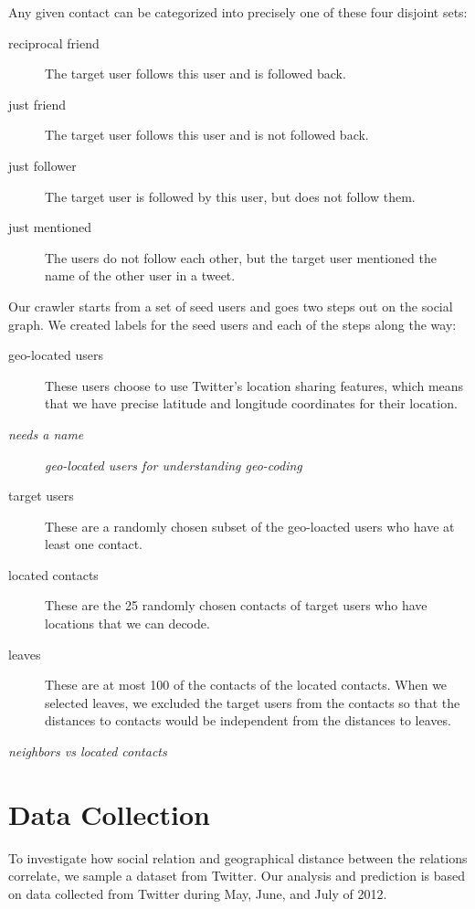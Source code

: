 Any given contact can be categorized into precisely one of these four disjoint
sets:
\begin{description}
\item[reciprocal friend] The target user follows this user and is followed
    back.
\item[just friend] The target user follows this user and is not followed
    back.
\item[just follower] The target user is followed by this user, but does
    not follow them.
\item[just mentioned] The users do not follow each other, but the target
    user mentioned the name of the other user in a tweet.
\end{description}

Our crawler starts from a set of seed users and goes two steps out on the
social graph.
%
We created labels for the seed users and each of the steps along the way:

\begin{description}
\item[geo-located users] These users choose to use Twitter's location sharing
    features, which means that we have precise latitude and longitude
    coordinates for their location.
\item[\emph{needs a name}] \emph{geo-located users for understanding geo-coding}
\item[target users] These are a randomly chosen subset of the geo-loacted users
    who have at least one contact.
\item[located contacts] These are the 25 randomly chosen contacts of
    target users who have locations that we can decode.
\item[leaves] These are at most 100 of the contacts of the located contacts.
    When we selected leaves, we excluded the target users from the contacts so
    that the distances to contacts would be independent from the distances to
    leaves.
\end{description}

\emph{neighbors vs located contacts}


\section{Data Collection}
To investigate how social relation and geographical distance between the
relations correlate, we sample a dataset from Twitter.
%
Our analysis and prediction is based on data collected from Twitter during
May, June, and July of 2012.

